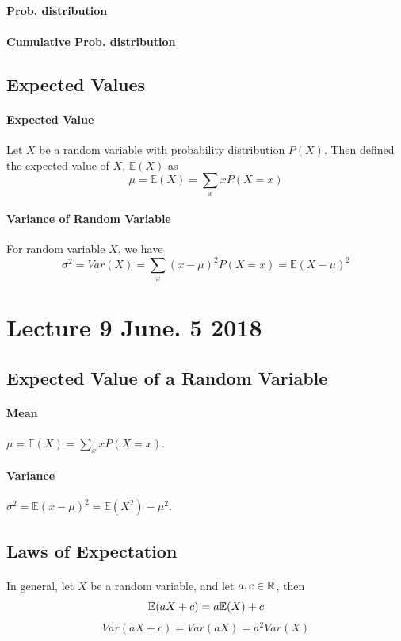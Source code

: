 \documentclass{article}
\begin{document}
		\paragraph{Prob. distribution}
		\paragraph{Cumulative Prob. distribution}
		
		\subsection{Expected Values}
		\paragraph{Expected Value} Let $X$ be a random variable with probability distribution $P(X)$. Then defined the expected value of $X$, $\mathbb{E}(X)$ as 
			\[
				\mu = \mathbb{E}(X) = \sum_{x}{x P(X=x)}
			\]
		\paragraph{Variance of Random Variable} For random variable $X$, we have
			\[
				\sigma^2 = Var(X) = \sum_{x}{(x - \mu)^2P(X=x)} = \mathbb{E}(X-\mu)^2
			\]
			
	\section{Lecture 9 June. 5 2018}
		\subsection{Expected Value of a Random Variable}
			\paragraph{Mean} $\mu = \mathbb{E}(X) = \sum_{x}{xP(X=x)}$.
			\paragraph{Variance} $\sigma^2 = \mathbb{E}(x - \mu)^2 = \mathbb{E}(X^2) - \mu^2$.
		\subsection{Laws of Expectation}
			\paragraph{} In general, let $X$ be a random variable, and let $a, c \in \mathbb{R}$, then
				\[
					\mathbb{E}({aX+c}) = a \mathbb{E}({X}) + c
				\]
				\[
					Var(aX+c) = Var(aX) = a^2 Var(X)
				\]
\end{document}
